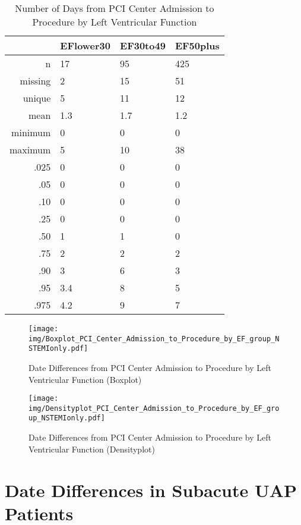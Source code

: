 \documentclass[a4paper]{report}
\begin{document}
\begin{itemize}
{%
\begin{table}[ht]
\centering
\begin{tabular}{rlll}
  \toprule
 & EFlower30 & EF30to49 & EF50plus \\ 
  \midrule
n & 17 & 95 & 425 \\ 
  missing & 2 & 15 & 51 \\ 
  unique & 5 & 11 & 12 \\ 
  mean & 1.3 & 1.7 & 1.2 \\ 
  minimum & 0 & 0 & 0 \\ 
  maximum & 5 & 10 & 38 \\ 
  .025 & 0 & 0 & 0 \\ 
  .05 & 0 & 0 & 0 \\ 
  .10 & 0 & 0 & 0 \\ 
  .25 & 0 & 0 & 0 \\ 
  .50 & 1 & 1 & 0 \\ 
  .75 & 2 & 2 & 2 \\ 
  .90 & 3 & 6 & 3 \\ 
  .95 & 3.4 & 8 & 5 \\ 
  .975 & 4.2 & 9 & 7 \\ 
   \bottomrule
\end{tabular}
\caption{Number of Days from PCI Center Admission to Procedure by Left Ventricular Function} 
\end{table}
\begin{figure}
  \centering
  \caption{Date Differences from PCI Center Admission to Procedure by Left Ventricular Function (Boxplot)}
  \label{Boxplot: Date Differences from PCI Center Admission to Procedure by Left Ventricular Function}
\texttt{[image: img/Boxplot\_PCI\_Center\_Admission\_to\_Procedure\_by\_EF\_group\_NSTEMIonly.pdf]}\end{figure}


\begin{figure}
  \centering
  \caption{Date Differences from PCI Center Admission to Procedure by Left Ventricular Function (Densityplot)}
  \label{Density: Date Differences from PCI Center Admission to Procedure by Left Ventricular Function}
\texttt{[image: img/Densityplot\_PCI\_Center\_Admission\_to\_Procedure\_by\_EF\_group\_NSTEMIonly.pdf]}\end{figure}






\clearpage
\section{Date Differences in Subacute UAP Patients}

}
\end{itemize}
\end{document}
